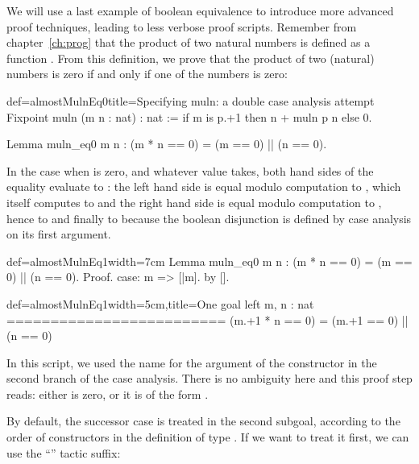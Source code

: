 We will use a last example of boolean equivalence to introduce more
advanced proof techniques, leading to less verbose proof
scripts. Remember from chapter~\ref{ch:prog} that the product of two
natural numbers is defined as a function
. From this definition, we prove that
the product of two (natural) numbers is zero if and only if one of the
numbers is zero:

\begin{coq}{def=almostMulnEq0}{title=Specifying muln: a double case analysis attempt}
Fixpoint muln (m n : nat) : nat :=
  if m is p.+1 then n + muln p n else 0.

Lemma muln_eq0 m n : (m * n == 0) = (m == 0) || (n == 0).
\end{coq}
In the case when  is zero, and whatever value  takes, both
hand sides of the equality evaluate to : the left hand side is
equal modulo computation to , which itself computes to
 and the right hand side is equal modulo computation to
, hence to  and finally to
 because the boolean disjunction \C{(_ || _)} is defined by
case analysis on its first argument.

\begin{coq}{def=almostMulnEq1}{width=7cm}
Lemma muln_eq0 m n :
  (m * n == 0) = (m == 0) || (n == 0).
Proof.
case: m => [|m].
  by [].
\end{coq}
\begin{coqout}{def=almostMulnEq1}{width=5cm,title=One goal left}
m, n : nat
=========================
(m.+1 * n == 0) =
  (m.+1 == 0) || (n == 0)
\end{coqout}
In this script, we used the name  for the argument of the
constructor in the second branch of the case analysis. There is no
ambiguity here and this proof step reads: either  is zero, or it
is of the form .

By default, the successor case is treated in the second subgoal,
according to the order of constructors in the definition of type
. If we want to treat it first, we can use the ``'' tactic suffix:


